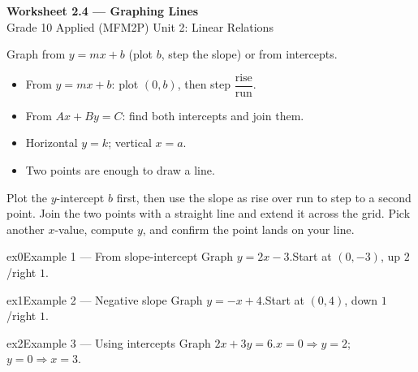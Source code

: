 \documentclass[11pt]{article}
\begin{document}
\begin{center}
{\LARGE\bfseries\color{titleblue}Worksheet 2.4 --- Graphing Lines}\\[2pt]
{\small Grade 10 Applied (MFM2P) \textperiodcentered{} Unit 2: Linear Relations}
\end{center}

\begin{ideabox}
Graph from $y=mx+b$ (plot $b$, step the slope) or from intercepts.
\begin{itemize}[leftmargin=*,itemsep=2pt]
  \item From $y=mx+b$: plot $(0,b)$, then step $\dfrac{\text{rise}}{\text{run}}$.
  \item From $Ax+By=C$: find both intercepts and join them.
  \item Horizontal $y=k$; vertical $x=a$.
  \item Two points are enough to draw a line.
\end{itemize}
\end{ideabox}

\begin{learnbox}
Plot the $y$-intercept $b$ first, then use the slope as rise over run to step to a second point.
Join the two points with a straight line and extend it across the grid.
Pick another $x$-value, compute $y$, and confirm the point lands on your line.
\end{learnbox}


\begin{example}{ex0}{Example 1 --- From slope-intercept}
Graph $y=2x-3$.\soln Start at $(0,-3)$, up $2$/right $1$.
\end{example}

\begin{example}{ex1}{Example 2 --- Negative slope}
Graph $y=-x+4$.\soln Start at $(0,4)$, down $1$/right $1$.
\end{example}

\begin{example}{ex2}{Example 3 --- Using intercepts}
Graph $2x+3y=6$.\soln $x=0\Rightarrow y=2$; $y=0\Rightarrow x=3$.
\end{example}
\end{document}
